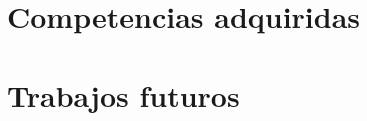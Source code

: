 \documentclass[a4paper, 12pt]{book}
\begin{document}
		
	\section{Competencias adquiridas} 
	\label{sec:competencias_adquiridas} 
	
		
	\section{Trabajos futuros} 
	\label{sec:trabajos_futuros} 


	\cleardoublepage
	
	
\end{document}
